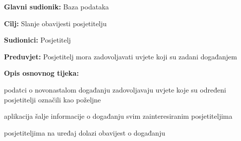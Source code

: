 					\noindent {}
					\begin{packed_item}
	
						\item \textbf{Glavni sudionik: }Baza podataka 
						\item  \textbf{Cilj:} Slanje obavijesti posjetitelju 
						\item  \textbf{Sudionici:} Posjetitelj
						\item  \textbf{Preduvjet:} Posjetitelj mora zadovoljavati uvjete koji su zadani događanjem
						\item  \textbf{Opis osnovnog tijeka:}
						
						\item[] \begin{packed_enum}
	
							\item podatci o novonastalom događanju zadovoljavaju uvjete koje su određeni posjetitelji označili kao poželjne
							\item aplikacija šalje informacije o događanju svim zainteresiranim posjetiteljima
							\item posjetiteljima na uređaj dolazi obavijest o događanju
						\end{packed_enum}
						
					\end{packed_item}
					
